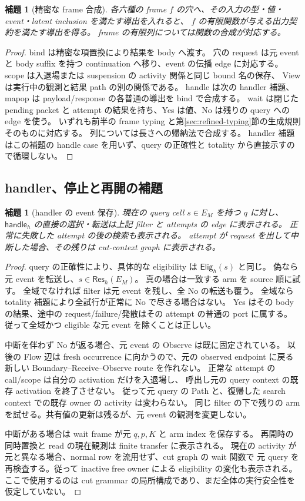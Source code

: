 \documentclass[11pt,a4paper]{article}
\newtheorem{lemma}[definition]{補題}
\newcommand{\Handle}{\mathsf{handle}}
\begin{document}
\begin{lemma}[精密な frame 合成]
各六種の frame \(f\) の穴へ、その入力の型・値・event・latent inclusion を満たす導出を入れると、
\(f\) の有限関数が与える出力契約を満たす導出を得る。
frame の有限列については関数の合成が対応する。
\end{lemma}
\begin{proof}
bind は精密な項置換により結果を body へ渡す。
穴の request は元 event と body suffix を持つ continuation へ移り、event の伝播 edge に対応する。
scope は入退場または suspension の activity 関係と同じ bound 名の保存、
View は実行中の観測と結果 path の別の関係である。
handle は次の handler 補題、mapop は payload/response の各普通の導出を bind で合成する。
wait は閉じた pending packet と attempt の結果を持ち、Yes は値、No は残りの query への edge を使う。
いずれも前半の frame typing と第\ref{sec:refined-typing}節の生成規則そのものに対応する。
列については長さへの帰納法で合成する。
handler 補題はこの補題の handle case を用いず、query の正確性と totality から直接示すので循環しない。
\end{proof}

\subsection{handler、停止と再開の補題}

\begin{lemma}[handler の event 保存]
現在の query cell \(s\in E_M\) を持つ \(q\) に対し、
\(\Handle_h\) の直接の選択・転送は上記 filter と attempts の edge に表示される。
正常に失敗した attempt の後の検索も表示される。
attempt が request を出して中断した場合、その残りは cut-context graph に表示される。
\end{lemma}
\begin{proof}
query の正確性により、具体的な eligibility は \(\mathsf{Elig}_h(s)\) と同じ。
偽なら元 event を転送し、\(s\in\mathsf{Res}_h(E_M)\)。
真の場合は一致する arm を source 順に試す。
全域でなければ filter は元 event を残し、全 No の転送も覆う。
全域なら totality 補題により全試行が正常に No で尽きる場合はない。
Yes はその body の結果、途中の request/failure/発散はその attempt の普通の port に属する。
従って全域かつ eligible な元 event を除くことは正しい。

中断を伴わず No が返る場合、元 event の Observe は既に固定されている。
以後の Flow 辺は fresh occurrence に向かうので、元の observed endpoint に戻る
新しい Boundary--Receive--Observe route を作れない。
正常な attempt の call/scope は自分の activation だけを入退場し、
呼出し元の query context の既存 activation を終了させない。
従って元 query の Path と、復帰した search context での既存 owner の activity は変わらない。
同じ filter の下で残りの arm を試せる。共有値の更新は残るが、元 event の観測を変更しない。

中断がある場合は wait frame が元 \(q,p,K\) と arm index を保存する。
再開時の同時置換と read の現在観測は finite transfer に表示される。
現在の activity が元と異なる場合、normal row を流用せず、cut graph の wait 関数で
元 query を再検査する。従って inactive free owner による eligibility の変化も表示される。
ここで使用するのは cut grammar の局所構成であり、まだ全体の実行安全性を仮定していない。
\end{proof}
\end{document}
